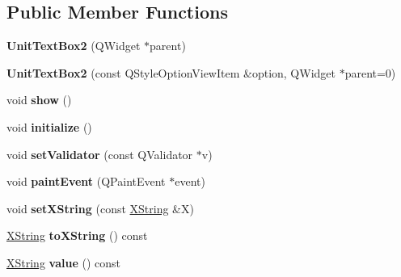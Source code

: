 \subsection*{Public Member Functions}
\begin{DoxyCompactItemize}
\item 
\mbox{\label{class_unit_text_box2_a8f380834e92120628021dda79190b2f2}} 
{\bfseries Unit\+Text\+Box2} (Q\+Widget $\ast$parent)
\item 
\mbox{\label{class_unit_text_box2_a1044889baf9d3cd88f045b499cf4e4b6}} 
{\bfseries Unit\+Text\+Box2} (const Q\+Style\+Option\+View\+Item \&option, Q\+Widget $\ast$parent=0)
\item 
\mbox{\label{class_unit_text_box2_a27662352ffd18a1a1bc44842087040f0}} 
void {\bfseries show} ()
\item 
\mbox{\label{class_unit_text_box2_aa6995ea302a6034384a5477e7317a29e}} 
void {\bfseries initialize} ()
\item 
\mbox{\label{class_unit_text_box2_a87b55243e95c604460516115f8864a7b}} 
void {\bfseries set\+Validator} (const Q\+Validator $\ast$v)
\item 
\mbox{\label{class_unit_text_box2_abef5d4a731ff7fb24b32e3afe4736f0b}} 
void {\bfseries paint\+Event} (Q\+Paint\+Event $\ast$event)
\item 
\mbox{\label{class_unit_text_box2_ab7784d124988f38a6e0f15c899441de0}} 
void {\bfseries set\+X\+String} (const \hyperlink{class_x_string}{X\+String} \&X)
\item 
\mbox{\label{class_unit_text_box2_ab97bc0a56f562391e3210b9a66b1b62c}} 
\hyperlink{class_x_string}{X\+String} {\bfseries to\+X\+String} () const
\item 
\mbox{\label{class_unit_text_box2_a2934ca3242baa501bfa0a748907a46de}} 
\hyperlink{class_x_string}{X\+String} {\bfseries value} () const
\item 
\mbox{\label{class_unit_text_box2_a469f72a816de78bd253029ebf3abd2d6}} 

\end{DoxyCompactItemize}
